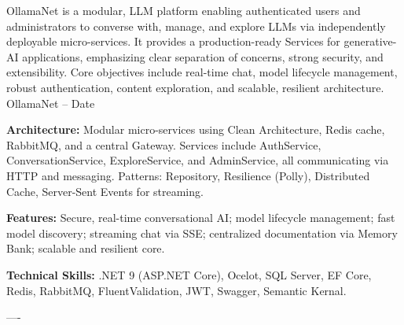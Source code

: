 

\begin{cventries}

\cventry
    {OllamaNet is a modular, LLM platform enabling authenticated users and administrators to converse with, manage, and explore LLMs
    via independently deployable micro-services.
    It provides a production-ready Services for generative-AI applications,
    emphasizing clear separation of concerns, strong security, and extensibility.
    Core objectives include real-time chat, model lifecycle management, robust authentication, content exploration, and scalable, resilient architecture.}
    {OllamaNet}
    {--}
    {Date}
    {
      \begin{cvitems}
        \item \textbf{Architecture:}{ Modular micro-services using Clean Architecture, Redis cache, RabbitMQ, and a central Gateway. Services include AuthService, ConversationService, ExploreService, and AdminService, all communicating via HTTP and messaging. Patterns: Repository, Resilience (Polly), Distributed Cache, Server-Sent Events for streaming.}
        \item \textbf{Features:}{ Secure, real-time conversational AI; model lifecycle management; fast model discovery; streaming chat via SSE; centralized documentation via Memory Bank; scalable and resilient core.}
        \item \textbf{Technical Skills:}{ .NET 9 (ASP.NET Core), Ocelot, SQL Server, EF Core, Redis, RabbitMQ, FluentValidation, JWT, Swagger, Semantic Kernal. }
      \end{cvitems}
    }
    \begin{singlespace}
----
\end{singlespace}



\end{cventries}
